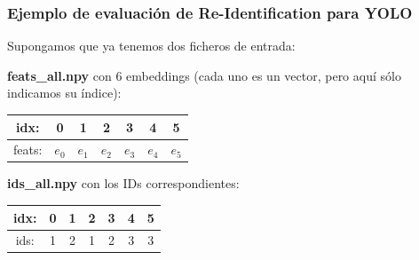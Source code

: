 \documentclass[12pt, a4paper, twoside]{article}
\begin{document}
 	
 	\subsubsection{Ejemplo de evaluación de Re-Identification para YOLO}
 	
 	Supongamos que ya tenemos dos ficheros de entrada:
 	
 	\medskip
 	\noindent
 	\textbf{feats\_all.npy} con 6 embeddings (cada uno es un vector, pero aquí sólo indicamos su índice):
 	\begin{center}
 		\begin{tabular}{c|cccccc}
 			idx:   & 0 & 1 & 2 & 3 & 4 & 5 \\ \hline
 			feats: & $e_0$ & $e_1$ & $e_2$ & $e_3$ & $e_4$ & $e_5$
 		\end{tabular}
 	\end{center}
 	
 	\medskip
 	\noindent
 	\textbf{ids\_all.npy} con los IDs correspondientes:
 	\begin{center}
 		\begin{tabular}{c|cccccc}
 			idx: & 0 & 1 & 2 & 3 & 4 & 5 \\ \hline
 			ids: & 1 & 2 & 1 & 2 & 3 & 3
 		\end{tabular}
 	\end{center}
 	
 	\bigskip
 	
\end{document}
